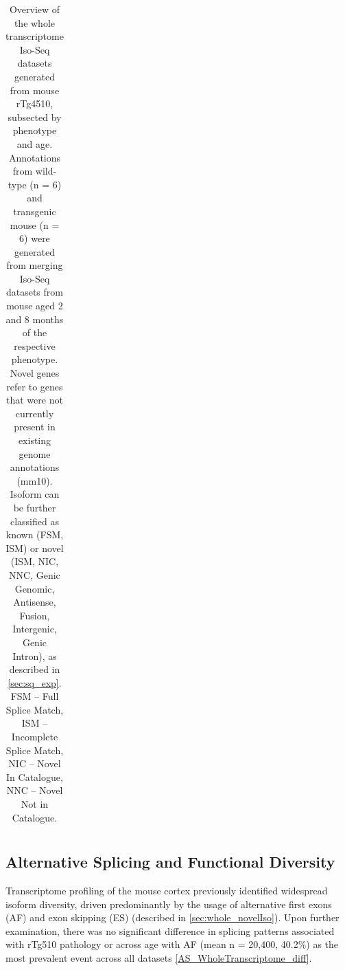 \begin{landscape}
\begin{table}[]
{\begin{tabular}{@{}ccccccc@{}}
			\end{tabular}%
		}
	\caption[Overview of the whole transcriptome Iso-Seq datasets generated from mouse rTg4510, subsected by phenotype and age]%
	{Overview of the whole transcriptome Iso-Seq datasets generated from mouse rTg4510, subsected by phenotype and age. Annotations from wild-type (n = 6) and transgenic mouse (n = 6) were generated from merging Iso-Seq datasets from mouse aged 2 and 8 months of the respective phenotype. Novel genes refer to genes that were not currently present in existing genome annotations (mm10). Isoform can be further classified as known (FSM, ISM) or novel (ISM, NIC, NNC, Genic Genomic, Antisense, Fusion, Intergenic, Genic Intron), as described in \cref{sec:sq_exp}. FSM – Full Splice Match, ISM – Incomplete Splice Match, NIC – Novel In Catalogue, NNC – Novel Not in Catalogue.}
	\label{tab:isoseq_whole_subsqantioutput}
		\end{table}
\end{landscape}

\subsection{Alternative Splicing and Functional Diversity}
Transcriptome profiling of the mouse cortex previously identified widespread isoform diversity, driven predominantly by the usage of alternative first exons (AF) and exon skipping (ES) (described in \cref{sec:whole_novelIso}). Upon further examination, there was no significant difference in splicing patterns associated with rTg510 pathology or across age with AF (mean n = 20,400, 40.2\%) as the most prevalent event across all datasets \cref{AS_WholeTranscriptome_diff}. 

